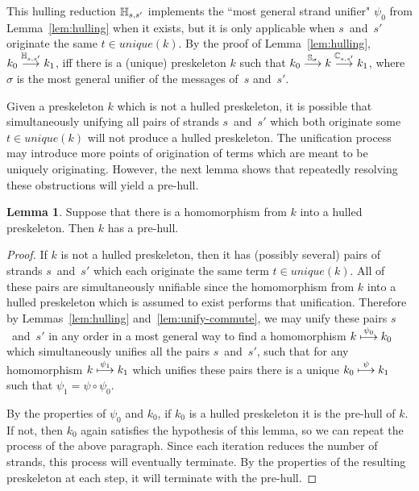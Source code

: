 \documentclass[12pt]{article}
\theoremstyle{definition}
\newtheorem{lem}[thm]{Lemma}
\begin{document}
This hulling reduction $\mathbb H_{s,s'}$ implements the
``most general strand unifier" $\psi_0$ from Lemma~\ref{lem:hulling}
when it exists, but it is only applicable when
$s$~and~$s'$ originate the same $t\in unique(k)$.
By the proof of Lemma~\ref{lem:hulling},
$k_0\stackrel{\mathbb H_{s,s'}}{\longrightarrow}k_1$, iff there is a (unique) preskeleton $k$ such
that $k_0\stackrel{\mathbb S_{\sigma}}{\longrightarrow}k\stackrel{\mathbb C_{s,s'}}{\longrightarrow}k_1$,
where $\sigma$ is the most general unifier of the messages of~$s$
and~$s'$.

Given a preskeleton $k$ which is not a hulled preskeleton,
it is possible that simultaneously unifying
all pairs of strands $s$~and~$s'$ which both originate some
$t\in unique(k)$ will not produce a hulled preskeleton.  The unification
process may introduce more points of origination of terms which are
meant to be uniquely originating.  However, the next lemma shows that
repeatedly resolving these obstructions will yield a pre-hull.

\begin{lem}\label{lem:prehull-exist}
Suppose that there is a homomorphism from $k$ into a hulled
preskeleton.  Then $k$ has a pre-hull.
\end{lem}

\begin{proof}
If $k$ is not a hulled preskeleton, then it has (possibly several)
pairs of strands $s$~and~$s'$ which each originate the same term
$t\in unique(k)$.  All of these pairs are simultaneously unifiable
since the homomorphism from $k$ into a hulled preskeleton which is
assumed to exist performs that unification.  Therefore by
Lemmas~\ref{lem:hulling} and~\ref{lem:unify-commute}, we may
unify these pairs $s$~and~$s'$ in any order in a most general way
to find a homomorphism $k\stackrel{\psi_0}{\longmapsto}k_0$ which simultaneously
unifies all the pairs $s$~and~$s'$, such that for any homomorphism
$k\stackrel{\psi_1}{\longmapsto}k_1$ which unifies these pairs there is a unique
$k_0\stackrel{\psi}{\longmapsto}k_1$ such that $\psi_1=\psi\circ\psi_0$.

By the properties of $\psi_0$ and $k_0$, if $k_0$ is a hulled
preskeleton it is the pre-hull of $k$.  If not, then $k_0$
again satisfies the hypothesis of this lemma, so we can repeat the
process of the above paragraph.  Since each iteration reduces the
number of strands, this process will eventually terminate.  By
the properties of the resulting preskeleton at each step, it will
terminate with the pre-hull.
\end{proof}
\end{document}
